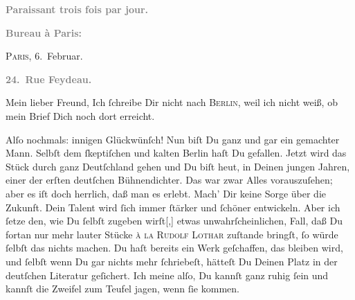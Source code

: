 \pstart
           \begin{otherlanguage}{french}\textcolor{gray}{\textbf{\textbf{Paraissant trois fois par jour.}}}\end{otherlanguage}\pend
           
\pstart
           \begin{otherlanguage}{french}\textcolor{gray}{\textbf{\textbf{Bureau à Paris:}}}\end{otherlanguage}\hfill \textsc{Paris}, 6. Februar.\pend
           
\pstart
           \begin{otherlanguage}{french}\textcolor{gray}{\textbf{\textbf{24. Rue Feydeau.}}}\end{otherlanguage}\pend
           
\pstart\center{}Mein lieber Freund,\pend\vspace{0.5em}
\pstart
           Ich{ }ſchreibe Dir nicht nach \textsc{Berlin}, weil ich nicht weiß, ob mein Brief Dich noch dort erreicht.\pend
           
\pstart
           Alſo nochmals: innigen Glückwünſch! Nun biſt Du ganz und gar ein gemachter Mann.
               Selbſt dem{ }ſkeptiſchen und kalten Berlin haſt Du
               gefallen. Jetzt wird das Stück
               durch ganz Deutſchland gehen\strikeout{,} und Du biſt heut, in Deinen jungen Jahren, einer der
               erſten deutſchen Bühnendichter. {\pb}Das war zwar Alles
               vorauszuſehen; aber es iſt doch herrlich, daß man es  erleb\strikeout{\textcolor{gray}{e}}t. Mach’ Dir keine Sorge über die Zukunft. Dein Talent wird{ }ſich immer{ }ſtärker
               und{ }ſchöner entwickeln. Aber ich{ }ſetze den, wie Du{ }ſelbſt zugeben
                  wirſt{[},{]} etwas unwahrſcheinlichen, Fall, daß  Du fortan nur mehr lauter Stücke \textsc{à la}{ }\textsc{Rudolf Lothar} zuſtande bringſt,{ }ſo würde{ }ſelbſt das nichts machen. Du haſt bereits ein Werk
               geſchaffen, das {\pb}bleiben wird, und{ }ſelbſt wenn Du
               gar nichts mehr{ }ſchriebeſt, hätteſt Du Deinen Platz in der deutſchen Literatur
               geſichert. Ich meine alſo, Du kannſt ganz ruhig{ }ſein\strikeout{,}
               und kannſt die Zweifel zum Teufel jagen, wenn{ }ſie kommen.\pend
           
